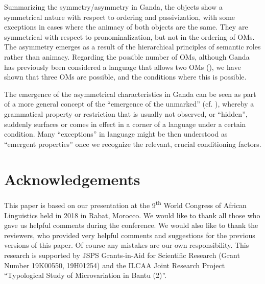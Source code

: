 \documentclass[output=paper,
            colorlinks, citecolor=brown
            ,draftmode
		  ]{langscibook}
\begin{document}
Summarizing the symmetry\slash asymmetry in Ganda, the objects show a symmetrical nature with respect to ordering and passivization, with some exceptions in cases where the animacy of both objects are the same. They are symmetrical with respect to pronominalization, but not in the ordering of OMs. The asymmetry emerges as a result of the hierarchical principles of semantic roles rather than animacy. Regarding the possible number of OMs, although Ganda has previously been considered a language that allows two OMs (\citealt{Ssekiryango2006, Marlo2015}), we have shown that three OMs are possible, and the conditions where this is possible.



The emergence of the asymmetrical characteristics in Ganda can be seen as part of a more general concept of the ``emergence of the unmarked'' (cf. \citealt{Bresnan1997,Bresnan2001}), whereby a grammatical property or restriction that is usually not observed, or ``hidden'', suddenly surfaces or comes in effect in a corner of a language under a certain condition. Many ``exceptions'' in language might be then understood as ``emergent properties'' once we recognize the relevant, crucial conditioning factors. 


\section*{Acknowledgements}
This paper is based on our presentation at the 9\textsuperscript{th} World Congress of African Linguistics held in 2018 in Rabat, Morocco. We would like to thank all those who gave us helpful comments during the conference. We would also like to thank the reviewers, who provided very helpful comments and suggestions for the previous versions of this paper. Of course any mistakes are our own responsibility. This research is supported by JSPS Grants-in-Aid for Scientific Research (Grant Number 19K00550, 19H01254) and the ILCAA Joint Research Project ``Typological Study of Microvariation in Bantu (2)''.

\sloppy\printbibliography[heading=subbibliography,notkeyword=this]
\end{document}
